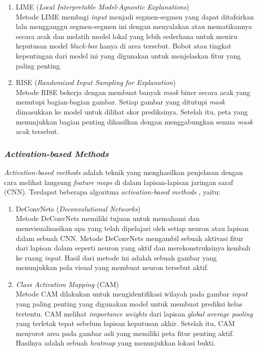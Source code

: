 \begin{enumerate}
	\item 	LIME (\textit{Local Interpretable Model-Agnostic Explanations})\\
	Metode LIME membagi \textit{input} menjadi segmen-segmen yang dapat ditafsirkan lalu mengganggu segmen-segmen ini dengan menyalakan atau mematikannya secara acak dan melatih model lokal yang lebih sederhana untuk meniru keputusan model \textit{black-box} hanya di area tersebut. Bobot atau tingkat kepentingan dari model ini yang digunakan untuk menjelaskan fitur yang paling penting.
	
	
	\item RISE (\textit{Randomized Input Sampling for Explanation})\\
	Metode RISE bekerja dengan membuat banyak \textit{mask} biner secara acak yang menutupi bagian-bagian gambar. Setiap gambar yang ditutupi \textit{mask} dimasukkan ke model untuk dilihat skor prediksinya. Setelah itu, peta yang menunjukkan bagian penting dihasilkan dengan menggabungkan semua \textit{mask} acak tersebut.
	
\end{enumerate}

\subsubsection{\textit{Activation-based Methods}}
\textit{Activation-based methods} adalah teknik yang menghasilkan penjelasan dengan cara melihat langsung \textit{feature maps} di dalam lapisan-lapisan jaringan saraf (CNN). Terdapat beberapa algoritma \textit{activation-based methods} \autocite{iftikhar2025explainable}, yaitu:


\begin{enumerate}
	\item DeConvNets (\textit{Deconvolutional Networks})\\
	Metode DeConvNets memiliki tujuan untuk memahami dan memvisualisasikan apa yang telah dipelajari oleh setiap neuron atau lapisan dalam sebuah CNN. Metode DeConvNets mengambil sebuah aktivasi fitur dari lapisan dalam seperti neuron yang aktif dan merekonstruksinya kembali ke ruang \textit{input}. Hasil dari metode ini adalah sebuah gambar yang menunjukkan pola visual yang membuat neuron tersebut aktif.
	
	\item \textit{Class Activation Mapping} (CAM)\\
	Metode CAM dilakukan untuk mengidentifikasi wilayah pada gambar \textit{input} yang paling penting yang digunakan model untuk membuat prediksi kelas tertentu. CAM melihat \textit{importance weights} dari lapisan \textit{global average pooling} yang terletak tepat sebelum lapisan keputusan akhir. Setelah itu, CAM menyorot area pada gambar asli yang memiliki peta fitur penting aktif. Hasilnya adalah sebuah \textit{heatmap} yang menunjukkan lokasi bukti. 
	
\end{enumerate}

